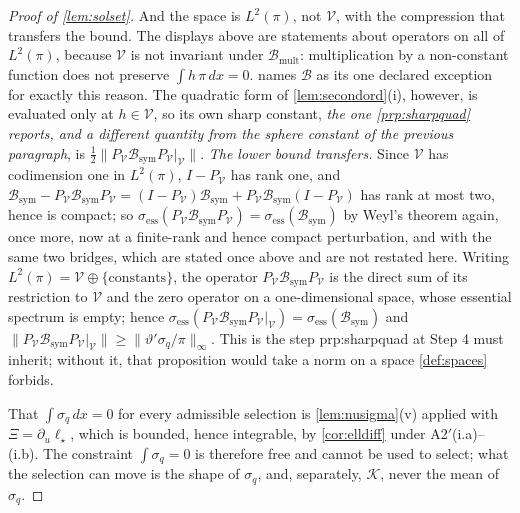 \begin{proof}[Proof of \cref{lem:solset}]
And the space is $L^{2}(\pi)$, not $\mathcal V$, with the compression that transfers the
bound. The displays above are statements about operators on all of $L^{2}(\pi)$, because $\mathcal V$ is
not invariant under $\mathcal B_{\mathrm{mult}}$: multiplication by a non-constant function does not
preserve
$\int h\,\pi\,dx=0$.  names $\mathcal B$ as its one declared exception for exactly this
reason. The quadratic form of \cref{lem:secondord}(i), however, is evaluated only at $h\in\mathcal V$, so
its own sharp constant, \emph{the one \cref{prp:sharpquad} reports, and a different quantity from the
sphere constant of the previous paragraph}, is
$\tfrac12\|P_{\mathcal V}\mathcal B_{\mathrm{sym}}P_{\mathcal V}|_{\mathcal V}\|$.
\emph{The lower bound transfers.} Since $\mathcal V$ has codimension one in $L^{2}(\pi)$, $I-P_{\mathcal V}$
has rank one, and
$\mathcal B_{\mathrm{sym}}-P_{\mathcal V}\mathcal B_{\mathrm{sym}}P_{\mathcal V}
=(I-P_{\mathcal V})\mathcal B_{\mathrm{sym}}+P_{\mathcal V}\mathcal B_{\mathrm{sym}}(I-P_{\mathcal V})$
has rank at most two, hence is compact; so
$\sigma_{\mathrm{ess}}(P_{\mathcal V}\mathcal B_{\mathrm{sym}}P_{\mathcal V})=\sigma_{\mathrm{ess}}(\mathcal B_{\mathrm{sym}})$
by Weyl's theorem again, \citet[Thm.~IV.5.35]{kato1995} once more, now at a finite-rank and hence
compact perturbation, and with the same two bridges, which are stated once above and are not restated
here. Writing $L^{2}(\pi)=\mathcal V\oplus\{\text{constants}\}$, the operator
$P_{\mathcal V}\mathcal B_{\mathrm{sym}}P_{\mathcal V}$ is the direct sum of its restriction to
$\mathcal V$ and the zero operator on a one-dimensional space, whose essential spectrum is empty; hence
$\sigma_{\mathrm{ess}}(P_{\mathcal V}\mathcal B_{\mathrm{sym}}P_{\mathcal V}|_{\mathcal V})
=\sigma_{\mathrm{ess}}(\mathcal B_{\mathrm{sym}})$ and
$\|P_{\mathcal V}\mathcal B_{\mathrm{sym}}P_{\mathcal V}|_{\mathcal V}\|\ge\|\vartheta'\sigma_q/\pi\|_\infty$.
This is the step \textup{prp:sharpquad} at Step 4 must inherit; without it, that proposition would
take a norm on a space \cref{def:spaces} forbids.

That $\int\sigma_q\,dx=0$ for every admissible selection is \cref{lem:nusigma}(v) applied with
$\Xi=\partial_u\ell_\star$, which is bounded, hence integrable, by \cref{cor:elldiff} under
A2$'$(i.a)--(i.b). The constraint $\int\sigma_q=0$ is therefore free and cannot be used to select;
what the selection can move is the shape of $\sigma_q$, and, separately, $\mathcal K$, never the
mean of $\sigma_q$.
\end{proof}

